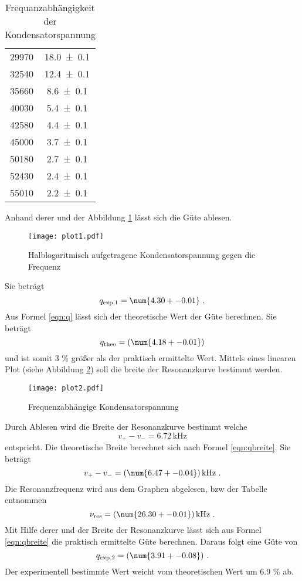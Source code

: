 \begin{table}
\begin{tabular}{c c}
	29970	& \num{18.0 +- 0.1}	\\
	32540	& \num{12.4 +- 0.1}	\\
	35660	& \num{8.6 +- 0.1}	\\
	40030 	& \num{5.4 +- 0.1}	\\
	42580 	& \num{4.4 +- 0.1}	\\
	45000	& \num{3.7 +- 0.1}	\\
	50180	& \num{2.7 +- 0.1}	\\
	52430 	& \num{2.4 +- 0.1}	\\
	55010	& \num{2.2 +- 0.1}	\\
	\bottomrule
 	\end{tabular}
  \caption{Frequanzabhängigkeit der Kondensatorspannung}
  \label{tab:U_c}
\end{table}
Anhand derer und der Abbildung \ref{fig:logUc} lässt sich die Güte ablesen.
\begin{figure}
  \centering
  \texttt{[image: plot1.pdf]}
  \caption{Halblogaritmisch aufgetragene Kondensatorspannung gegen die Frequenz}
  \label{fig:logUc}
\end{figure}
Sie beträgt
\begin{equation}
  q_\text{exp,1} = \num{4.30 +- 0.01} \ .
  \label{eqn:qexp}
\end{equation}
Aus Formel \ref{eqn:q} lässt sich der theoretische Wert der Güte berechnen. Sie beträgt
\begin{equation}
  q_\text{theo} = (\num{4.18 +- 0.01})
  \label{eqn:qtheo}
\end{equation}
und ist somit 3 \% größer als der praktisch ermittelte Wert. Mittels eines linearen Plot (siehe Abbildung \ref{fig:fUc}) soll die breite der Resonanzkurve bestimmt werden.
\begin{figure}
  \centering
  \texttt{[image: plot2.pdf]}
  \caption{Frequenzabhängige Kondensatorspannung}
  \label{fig:fUc}
\end{figure}
Durch Ablesen wird die Breite der Resonanzkurve bestimmt welche
\begin{equation}
  v_+ - v_- = 6.72 \, \text{kHz}
\end{equation}
entspricht. Die theoretische Breite berechnet sich nach Formel \ref{eqn:qbreite}. Sie beträgt
\begin{equation}
	v_+ - v_- = (\num{6.47 +- 0.04}) \, \text{kHz} \ .
	\label{eqn:nures}
\end{equation}
Die Resonanzfrequenz wird aus dem Graphen abgelesen, bzw der Tabelle entnommen
\begin{equation}
  \nu_\text{res} = (\num{26.30 +- 0.01}) \, \text{kHz} \ .
\end{equation}
Mit Hilfe derer und der Breite der Resonanzkurve lässt sich aus Formel \ref{eqn:qbreite} die praktisch ermittelte Güte berechnen. Daraus folgt eine Güte von
\begin{equation}
  q_\text{exp,2} = (\num{3.91 +- 0.08}) \ .
  \label{eqn:qexp2}
\end{equation}
Der experimentell bestimmte Wert weicht vom theoretischen Wert um 6.9 \% ab.
